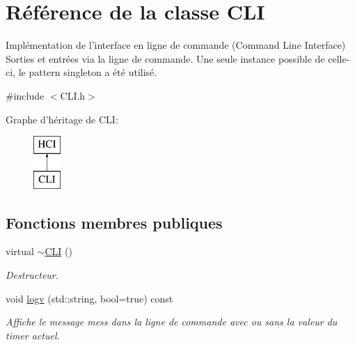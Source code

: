 \hypertarget{classCLI}{\section{Référence de la classe C\-L\-I}
\label{classCLI}
}


Implémentation de l'interface en ligne de commande (Command Line Interface) Sorties et entrées via la ligne de commande. Une seule instance possible de celle-\/ci, le pattern singleton a été utilisé.  




{\ttfamily \#include $<$C\-L\-I.\-h$>$}

Graphe d'héritage de C\-L\-I\-:\begin{figure}[H]
\begin{center}
\leavevmode
\includegraphics[height=2.000000cm]{classCLI}
\end{center}
\end{figure}
\subsection*{Fonctions membres publiques}
\begin{DoxyCompactItemize}
\item 
\hypertarget{classCLI_a9f59d57abf434f7161fcf3f61b725752}{virtual \hyperlink{classCLI_a9f59d57abf434f7161fcf3f61b725752}{$\sim$\-C\-L\-I} ()}\label{classCLI_a9f59d57abf434f7161fcf3f61b725752}

\begin{DoxyCompactList}\small\item\em Destructeur. \end{DoxyCompactList}\item 
\hypertarget{classCLI_a844e89b9d79ecf64b1a52cc80fb42663}{void \hyperlink{classCLI_a844e89b9d79ecf64b1a52cc80fb42663}{logv} (std\-::string, bool=true) const }\label{classCLI_a844e89b9d79ecf64b1a52cc80fb42663}

\begin{DoxyCompactList}\small\item\em Affiche le message mess dans la ligne de commande avec ou sans la valeur du timer actuel. \end{DoxyCompactList}\end{DoxyCompactItemize}
